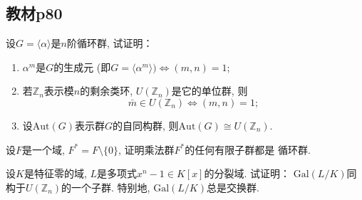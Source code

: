 \subsection{教材p80}

\begin{problem}
    设$G = \langle \alpha \rangle$是$n$阶循环群, 试证明：
\begin{enumerate}[(1)]
    \item $\alpha^m$是$G$的生成元 (即$G = \langle \alpha^m \rangle ) \Leftrightarrow (m, n) = 1$;
    \item 若$\mathbb{Z}_n$表示模$n$的剩余类环, $U(\mathbb{Z}_n)$是它的单位群, 则
\[
    \bar{m} \in U(\mathbb{Z}_n) \Leftrightarrow (m, n)=1;
\]
    \item 设$\mathrm{Aut}(G)$表示群$G$的自同构群, 则$\mathrm{Aut}(G) \cong U(\mathbb{Z}_n)$.
\end{enumerate}
\end{problem}

\begin{solution}
    
\end{solution}

\begin{problem}
    设$F$是一个域, $F^* = F \setminus \{0\}$, 证明乘法群$F^*$的任何有限子群都是
循环群.
\end{problem}

\begin{solution}
    
\end{solution}

\begin{problem}
    设$K$是特征零的域, $L$是多项式$x^n - 1 \in K[x]$的分裂域. 试证明：
$\mathrm{Gal}(L/K)$同构于$U(\mathbb{Z}_n)$的一个子群. 特别地, 
$\mathrm{Gal}(L/K)$总是交换群.
\end{problem}

\begin{solution}
    
\end{solution}
